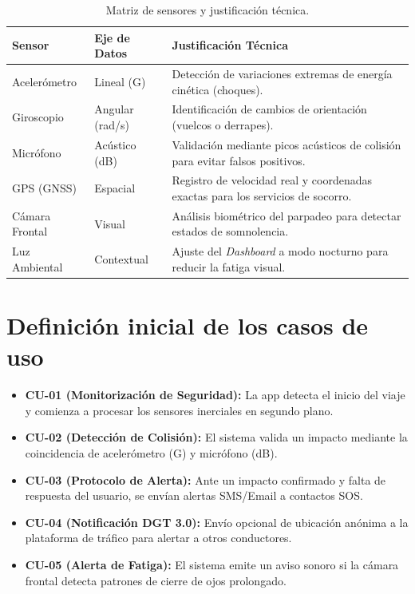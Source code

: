 \documentclass[11pt, a4paper]{article}
\begin{document}
    \begin{table}[H]
        \centering
        \caption{Matriz de sensores y justificación técnica.}
        \small
        \begin{tabularx}{\textwidth}{@{}l l X @{}}
        \toprule
        \textbf{Sensor} & \textbf{Eje de Datos} & \textbf{Justificación Técnica} \\ \midrule
        Acelerómetro & Lineal (G) & Detección de variaciones extremas de energía cinética (choques). \\
        Giroscopio & Angular (rad/s) & Identificación de cambios de orientación (vuelcos o derrapes). \\
        Micrófono & Acústico (dB) & Validación mediante picos acústicos de colisión para evitar falsos positivos. \\
        GPS (GNSS) & Espacial & Registro de velocidad real y coordenadas exactas para los servicios de socorro. \\
        Cámara Frontal & Visual & Análisis biométrico del parpadeo para detectar estados de somnolencia. \\
        Luz Ambiental & Contextual & Ajuste del \textit{Dashboard} a modo nocturno para reducir la fatiga visual. \\ \bottomrule
        \end{tabularx}
    \end{table}

    \section{Definición inicial de los casos de uso}
    \begin{itemize}
        \item \textbf{CU-01 (Monitorización de Seguridad):} La app detecta el inicio del viaje y comienza a procesar los sensores inerciales en segundo plano.
        \item \textbf{CU-02 (Detección de Colisión):} El sistema valida un impacto mediante la coincidencia de acelerómetro (G) y micrófono (dB).
        \item \textbf{CU-03 (Protocolo de Alerta):} Ante un impacto confirmado y falta de respuesta del usuario, se envían alertas SMS/Email a contactos SOS.
        \item \textbf{CU-04 (Notificación DGT 3.0):} Envío opcional de ubicación anónima a la plataforma de tráfico para alertar a otros conductores.
        \item \textbf{CU-05 (Alerta de Fatiga):} El sistema emite un aviso sonoro si la cámara frontal detecta patrones de cierre de ojos prolongado.
    \end{itemize}
\end{document}
